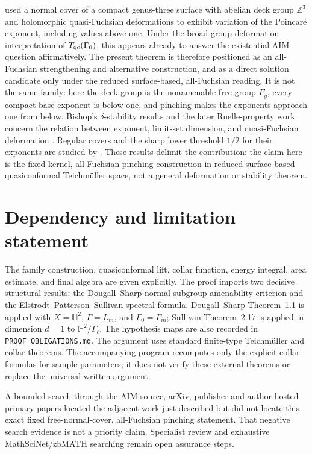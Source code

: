 \documentclass[11pt]{article}
\theoremstyle{definition}
\newcommand{\Hh}{\mathbb H^2}
\begin{document}
\citet{AstalaZinsmeister1995} used a normal cover of a compact genus-three
surface with abelian deck group $\mathbb Z^3$ and holomorphic quasi-Fuchsian
deformations to exhibit variation of the Poincar\'e exponent, including values
above one.  Under the broad group-deformation interpretation of
$T_{\rm qc}(\Gamma_0)$, this appears already to answer the existential AIM
question affirmatively.  The present theorem is therefore positioned as an
all-Fuchsian strengthening and alternative construction, and as a direct
solution candidate only under the reduced surface-based, all-Fuchsian reading.
It is not the same family: here the deck group is the
nonamenable free group $F_g$, every compact-base exponent is below one, and
pinching makes the exponents approach one from below.  Bishop's
$\delta$-stability results and the later Ruelle-property work concern the
relation between exponent, limit-set dimension, and quasi-Fuchsian
deformation \citep{Bishop2003,HuoZinsmeister2022}.  Regular covers and the
sharp lower threshold $1/2$ for their exponents are studied by
\citet{BonfertTaylorEtAl2012}.  These results delimit the contribution: the
claim here is the fixed-kernel, all-Fuchsian pinching construction in reduced
surface-based quasiconformal Teichm\"uller space, not a general deformation or
stability theorem.

\section{Dependency and limitation statement}

The family construction, quasiconformal lift, collar function, energy
integral, area estimate, and final algebra are given explicitly.  The proof
imports two decisive structural results: the Dougall--Sharp normal-subgroup
amenability criterion and the Elstrodt--Patterson--Sullivan spectral formula.
Dougall--Sharp Theorem~1.1 is applied with $X=\Hh$, $\Gamma=L_m$, and
$\Gamma_0=\Gamma_m$; Sullivan Theorem~2.17 is applied in dimension $d=1$ to
$\Hh/\Gamma_\ell$.  The hypothesis maps are also recorded in
\texttt{PROOF\_OBLIGATIONS.md}.  The argument uses standard finite-type
Teichm\"uller and collar theorems.  The
accompanying program recomputes only the explicit collar formulas for sample
parameters; it does not verify these external theorems or replace the
universal written argument.

A bounded search through the AIM source, arXiv, publisher and author-hosted
primary papers located the adjacent work just described but did not locate
this exact fixed free-normal-cover, all-Fuchsian pinching statement.  That
negative search evidence is not a priority claim.  Specialist review and
exhaustive MathSciNet/zbMATH searching remain open assurance steps.
\end{document}
